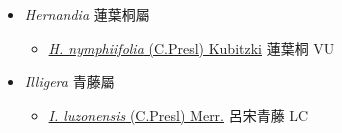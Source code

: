 
  \begin{itemize}
 \item[] \textit{Hernandia} 蓮葉桐屬
                                
  \begin{itemize}
        \item[] \href{http://www.theplantlist.org/tpl1.1/search?q=Hernandia+nymphiifolia}{\textit{H. nymphiifolia} (C.Presl) Kubitzki}   蓮葉桐   VU
  \end{itemize}
 \item[] \textit{Illigera} 青藤屬
                                
  \begin{itemize}
        \item[] \href{http://www.theplantlist.org/tpl1.1/search?q=Illigera+luzonensis}{\textit{I. luzonensis} (C.Presl) Merr.}   呂宋青藤   LC
  \end{itemize}
  \end{itemize}
